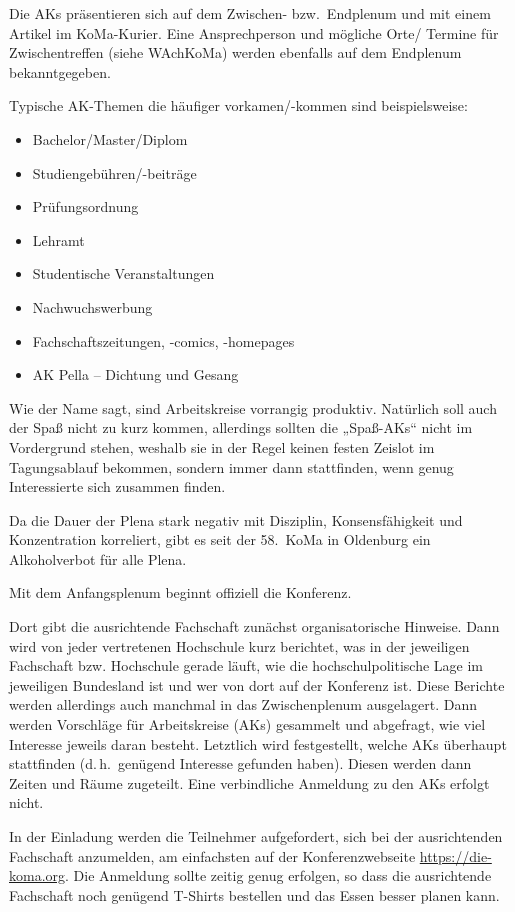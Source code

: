 \begin{description}
	Die AKs präsentieren sich auf dem Zwischen- bzw.\ Endplenum und mit einem Artikel im KoMa-Kurier. Eine Ansprechperson und mögliche Orte/ Termine für Zwischentreffen (siehe WAchKoMa) werden ebenfalls auf dem Endplenum bekanntgegeben.

	Typische AK-Themen die häufiger vorkamen/-kommen sind beispielsweise:
	\begin{itemize}
		\item Bachelor/Master/Diplom
		\item Studiengebühren/-beiträge
		\item Prüfungsordnung
		\item Lehramt
		\item Studentische Veranstaltungen
		\item Nachwuchswerbung
		\item Fachschaftszeitungen, -comics, -homepages
		\item AK Pella -- Dichtung und Gesang
	\end{itemize}
	Wie der Name sagt, sind Arbeitskreise vorrangig produktiv. Natürlich soll auch der Spaß nicht zu kurz kommen, allerdings sollten die „Spaß-AKs“ nicht im Vordergrund stehen, weshalb sie in der Regel keinen festen Zeislot im Tagungsablauf bekommen, sondern immer dann stattfinden, wenn genug Interessierte sich zusammen finden.

\item[Alkoholverbot im Plenum]
    Da die Dauer der Plena stark negativ mit Disziplin, Konsensfähigkeit und Konzentration korreliert, gibt es seit der 58.~KoMa in Oldenburg ein Alkoholverbot für alle Plena.

\item[Anfangsplenum]
    Mit dem Anfangsplenum beginnt offiziell die Konferenz.

    Dort gibt die ausrichtende Fachschaft zunächst organisatorische Hinweise. Dann wird von jeder vertretenen Hochschule kurz berichtet, was in der jeweiligen Fachschaft bzw. Hochschule gerade läuft, wie die hochschulpolitische Lage im jeweiligen Bundesland ist und wer von dort auf der Konferenz ist. Diese Berichte werden allerdings auch manchmal in das Zwischenplenum ausgelagert. Dann werden Vorschläge für Arbeitskreise (AKs) gesammelt und abgefragt, wie viel Interesse jeweils daran besteht. Letztlich wird festgestellt, welche AKs überhaupt stattfinden (d.\,h.\ genügend Interesse gefunden haben). Diesen werden dann Zeiten und Räume zugeteilt. Eine verbindliche Anmeldung zu den AKs erfolgt nicht.

\item[Anmeldung]
    In der Einladung werden die Teilnehmer aufgefordert, sich bei der ausrichtenden Fachschaft anzumelden, am einfachsten auf der Konferenzwebseite \url{https://die-koma.org}. Die Anmeldung sollte zeitig genug erfolgen, so dass die ausrichtende Fachschaft noch genügend T-Shirts bestellen und das Essen besser planen kann.


\end{description}
